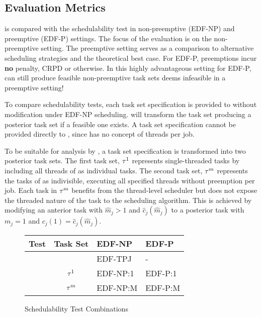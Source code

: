 \subsection{Evaluation Metrics}

\tpj{} is compared with the \npchunks{} schedulability test in
non-preemptive (EDF-NP) and preemptive (EDF-P) settings. The focus of
the evaluation is on the non-preemptive setting. The preemptive
setting serves as a comparison to alternative scheduling strategies
and the theoretical best case. For EDF-P, preemptions incur
\textbf{no} penalty, CRPD or otherwise. In this highly advantageous
setting for EDF-P, \tpj{} can still produce feasible non-preemptive task
sets \npchunks{} deems infeasible in a preemptive setting!

To compare schedulability tests, each task set specification \ants{}
is provided to \tpj{} without modification under EDF-NP
scheduling. \tpj{} will transform the task set producing a
posterior task set \tasks{} if a feasible one exists. A task set
specification \ants{} cannot be provided directly to \npchunks{},
since \npchunks{} has no concept of threads per job. 

To be suitable for analysis by \npchunks{}, a task set specification
\ants{} is transformed into two posterior task sets. The first task
set, ${\tau{}^1}$ represents single-threaded tasks by including all
threads of \ants{} as individual tasks. The second task set,
${\tau{}^m}$ represents the tasks of \ants{} as indivisible,
executing all specified threads without preemption per job. Each task
in ${\tau{}^m}$ benefits from the  thread-level scheduler but does
not expose the threaded nature of the task to the scheduling
algorithm. This is achieved by modifying an anterior task  with
${\hat{m}_j > 1}$ and ${\hat{c}_j(\hat{m}_j)}$ to a posterior task
 with ${m_j = 1}$ and ${c_j(1) = \hat{c}_j(\hat{m}_j)}$. 

\begin{figure}[ht]
  \centering
  \begin{tabular}{|c|c|l|l|}
    \hline
    \textbf{Test} & \textbf{Task Set} & \textbf{EDF-NP} & \textbf{EDF-P} \\
    \hline
    \hline
    \tpj{} & \ants{} & EDF-TPJ & - \\
    \hline
    \multirow{2}{*}{\npchunks{}}
    & ${\tau{}^1}$ & EDF-NP:1 & EDF-P:1 \\
    & ${\tau{}^m}$ & EDF-NP:M & EDF-P:M \\
    \hline
  \end{tabular}
  \caption{Schedulability Test Combinations}
  \label{table:combinations}
\end{figure}

